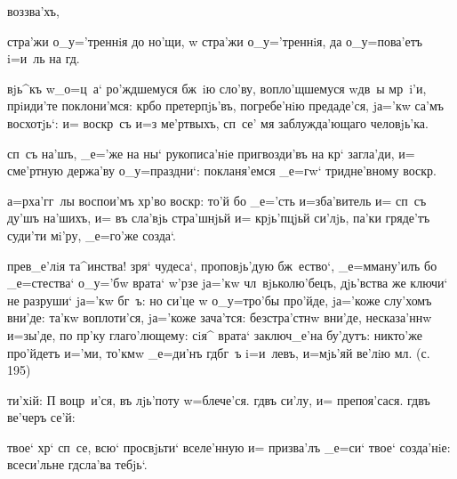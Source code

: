 
  воззва'хъ, 

 стра'жи о_у='треннiя до но'щи, w\т 
стра'жи о_у='треннiя, да о_у=пова'етъ i=и~ль на гд.

 вjь^къ w\т _о=ц~а` ро'ждшемуся бж~iю 
сло'ву, вопло'щшемуся w\т дв~ы мр~i'и, прiиди'те 
поклони'мся: кр бо претерпjь'въ, погребе'нiю 
предаде'ся, jа='кw са'мъ восхотjь`: и= воскр~съ и=з\ъ 
ме'ртвыхъ, сп~се' мя заблужда'ющаго человjь'ка.

 сп~съ на'шъ, _е='же на ны` рукописа'нiе 
пригвозди'въ на кр` загла'ди, и= сме'ртную держа'ву 
о_у=праздни`: покланя'емся _е=гw` тридне'вному 
воскр.

 а=рха'гг~лы воспои'мъ хр'во воскр: 
то'й бо _е='сть и=зба'витель и= сп~съ ду'шъ на'шихъ, и= 
въ сла'вjь стра'шнjьй и= крjь'пцjьй си'лjь, па'ки 
гряде'тъ суди'ти мi'ру, _е=го'же созда`.


 прев_е'лiя та^инства! зря` чудеса`, 
проповjь'дую бж~ество`, _е=мману'илъ бо _е=стества` 
о_у='бw врата` w'рзе jа='кw чл~вjьколю'бецъ, 
дjь'вства же ключи` не разруши` jа='кw бг~ъ: но си'це w\т 
о_у=тро'бы про'йде, jа='коже слу'хомъ вни'де: та'кw 
воплоти'ся, jа='коже зача'тся: безстра'стнw вни'де, 
несказа'ннw и=зы'де, по пр'ку глаго'лющему: сiя^ 
врата` заключ_е'на бу'дутъ: никто'же про'йдетъ и='ми, 
то'кмw _е=ди'нъ гд бг~ъ i=и~левъ, и=мjь'яй ве'лiю 
мл. (с. 195)

  ти'хiй: П   воцр~и'ся, въ лjь'поту w=блече'ся.    гд въ си'лу, и= препоя'сася. 
  гд въ ве'черъ се'й: 


 твое` хр` сп~се, всю` просвjьти` 
вселе'нную и= призва'лъ _е=си` твое` созда'нiе: 
всеси'льне гд сла'ва тебjь`.

